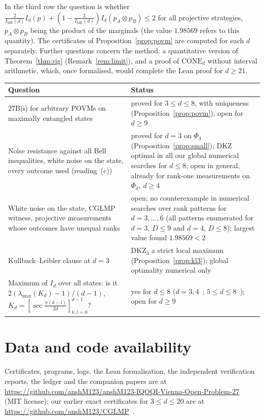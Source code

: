 \documentclass[11pt]{article}
\theoremstyle{remark}
\numberwithin{equation}{section}
\newcommand{\IME}{I_{\mathrm{ME}}}
\newcommand{\DKZ}{\mathrm{DKZ}}
\newcommand{\CONE}{\mathrm{CONE}}
\begin{document}
In the third row the question is whether $\frac2{\IME(d)}I_d(p)+(1-\frac2{\IME(d)})I_d(p_A\otimes p_B)\le2$ for all
projective strategies, $p_A\otimes p_B$ being the product of the marginals (the value $1.98569$ refers to this quantity).
The certificates of Proposition~\ref{prop:povm} are computed for each $d$ separately. Further questions concern the
method: a quantitative version of Theorem~\ref{thm:rig} (Remark~\ref{rem:limit}), and a proof of $\CONE_d$ without
interval arithmetic, which, once formalised, would complete the Lean proof for $d\ge21$.

\begin{center}\footnotesize
{}\label{tab:openq}
\begin{tabular}{@{}>{\raggedright\arraybackslash}p{}>{\raggedright\arraybackslash}p{}@{}}
\toprule
Question & Status\\
\midrule
27B(i) for arbitrary POVMs on maximally entangled states & proved for $3\le d\le8$, with uniqueness
(Proposition~\ref{prop:povm}); open for $d\ge9$\\
Noise resistance against all Bell inequalities, white noise on the state, every outcome used (reading~(c)) & proved for
$d=3$ on $\Phi_3$ (Proposition~\ref{prop:small}); DKZ optimal in all our global numerical searches for $d\le8$; open in
general, already for rank-one measurements on $\Phi_d$, $d\ge4$\\
White noise on the state, CGLMP witness, projective measurements whose outcomes have unequal ranks & open; no
counterexample in numerical searches over rank patterns for $d=3,\dots,6$ (all patterns enumerated for $d=3$, $D\le9$ and
$d=4$, $D\le8$); largest value found $1.98569<2$\\
Kullback--Leibler clause at $d=3$ & $\DKZ_3$ a strict local maximum (Proposition~\ref{prop:kl3}); global optimality
numerical only\\
Maximum of $I_d$ over all states: is it $2(\lambda_{\max}(K_d)-1)/(d-1)$, $K_d=[\sec\frac{\pi(k-l)}{2d}]_{k,l=0}^{d-1}$? &
yes for $d\le8$ ($d=3,4$~\cite{IR}; $5\le d\le8$~\cite{repoCGLMP}); open for $d\ge9$\\
\bottomrule
\end{tabular}
\end{center}

\section*{Data and code availability}
Certificates, programs, logs, the Lean formalisation, the independent verification reports, the ledger and the companion
papers are at \url{https://github.com/anshM123/anshM123-IQOQI-Vienna-Open-Problem-27}~\cite{repo} (MIT license); our
earlier exact certificates for $3\le d\le20$ are at \url{https://github.com/anshM123/CGLMP}~\cite{repoCGLMP}.
\end{document}

